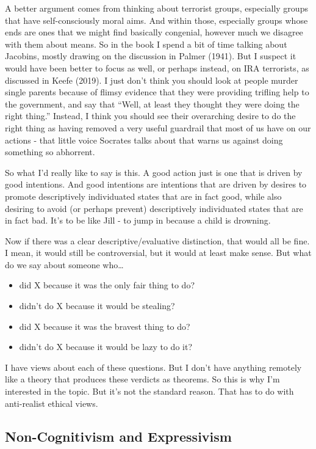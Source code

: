 \documentclass[
]{article}
\providecommand{\tightlist}{%
  \setlength{\itemsep}{0pt}\setlength{\parskip}{0pt}}
\begin{document}
A better argument comes from thinking about terrorist groups, especially
groups that have self-consciously moral aims. And within those,
especially groups whose ends are ones that we might find basically
congenial, however much we disagree with them about means. So in the
book I spend a bit of time talking about Jacobins, mostly drawing on the
discussion in Palmer (1941). But I suspect it would have been better to
focus as well, or perhaps instead, on IRA terrorists, as discussed in
Keefe (2019). I just don't think you should look at people murder single
parents because of flimsy evidence that they were providing trifling
help to the government, and say that ``Well, at least they thought they
were doing the right thing.'' Instead, I think you should see their
overarching desire to do the right thing as having removed a very useful
guardrail that most of us have on our actions - that little voice
Socrates talks about that warns us against doing something so abhorrent.

So what I'd really like to say is this. A good action just is one that
is driven by good intentions. And good intentions are intentions that
are driven by desires to promote descriptively individuated states that
are in fact good, while also desiring to avoid (or perhaps prevent)
descriptively individuated states that are in fact bad. It's to be like
Jill - to jump in because a child is drowning.

Now if there was a clear descriptive/evaluative distinction, that would
all be fine. I mean, it would still be controversial, but it would at
least make sense. But what do we say about someone who\ldots{}

\begin{itemize}
\tightlist
\item
  did X because it was the only fair thing to do?
\item
  didn't do X because it would be stealing?
\item
  did X because it was the bravest thing to do?
\item
  didn't do X because it would be lazy to do it?
\end{itemize}

I have views about each of these questions. But I don't have anything
remotely like a theory that produces these verdicts as theorems. So this
is why I'm interested in the topic. But it's not the standard reason.
That has to do with anti-realist ethical views.

\hypertarget{non-cognitivism-and-expressivism}{%
\subsection{Non-Cognitivism and
Expressivism}\label{non-cognitivism-and-expressivism}}
\end{document}
